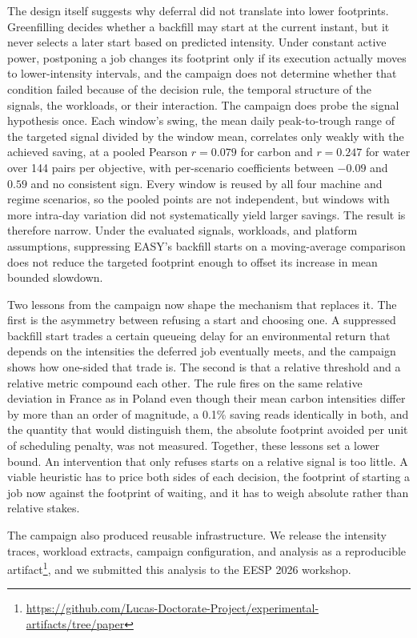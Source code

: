 The design itself suggests why deferral did not translate into lower footprints. Greenfilling decides whether a backfill may start at the current instant, but it never selects a later start based on predicted intensity. Under constant active power, postponing a job changes its footprint only if its execution actually moves to lower-intensity intervals, and the campaign does not determine whether that condition failed because of the decision rule, the temporal structure of the signals, the workloads, or their interaction. The campaign does probe the signal hypothesis once. Each window's swing, the mean daily peak-to-trough range of the targeted signal divided by the window mean, correlates only weakly with the achieved saving, at a pooled Pearson $r = 0.079$ for carbon and $r = 0.247$ for water over 144 pairs per objective, with per-scenario coefficients between $-0.09$ and $0.59$ and no consistent sign. Every window is reused by all four machine and regime scenarios, so the pooled points are not independent, but windows with more intra-day variation did not systematically yield larger savings. The result is therefore narrow. Under the evaluated signals, workloads, and platform assumptions, suppressing EASY's backfill starts on a moving-average comparison does not reduce the targeted footprint enough to offset its increase in mean bounded slowdown.

Two lessons from the campaign now shape the mechanism that replaces it. The first is the asymmetry between refusing a start and choosing one. A suppressed backfill start trades a certain queueing delay for an environmental return that depends on the intensities the deferred job eventually meets, and the campaign shows how one-sided that trade is. The second is that a relative threshold and a relative metric compound each other. The rule fires on the same relative deviation in France as in Poland even though their mean carbon intensities differ by more than an order of magnitude, a 0.1\% saving reads identically in both, and the quantity that would distinguish them, the absolute footprint avoided per unit of scheduling penalty, was not measured. Together, these lessons set a lower bound. An intervention that only refuses starts on a relative signal is too little. A viable heuristic has to price both sides of each decision, the footprint of starting a job now against the footprint of waiting, and it has to weigh absolute rather than relative stakes.

The campaign also produced reusable infrastructure. We release the intensity traces, workload extracts, campaign configuration, and analysis as a reproducible artifact\footnote{\url{https://github.com/Lucas-Doctorate-Project/experimental-artifacts/tree/paper}}, and we submitted this analysis to the EESP 2026 workshop.

